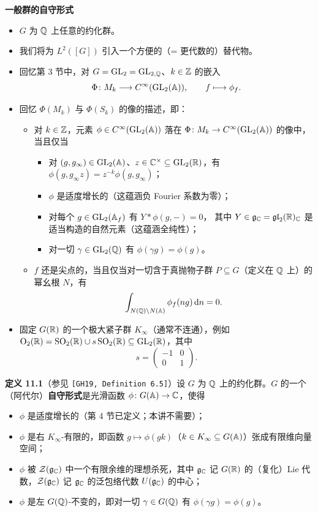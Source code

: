 \medskip
\noindent\textbf{一般群的自守形式}
\begin{itemize}
\item $G$ 为 $\mathbb{Q}$ 上任意的约化群。
\item 我们将为 $L^2([G])$ 引入一个方便的（= 更代数的）替代物。
\item 回忆第 3 节中，对 $G=\operatorname{GL}_2=\operatorname{GL}_{2,\mathbb{Q}}$、$k\in\mathbb{Z}$ 的嵌入
\[
\Phi\colon M_k\longrightarrow C^\infty(\operatorname{GL}_2(\mathbb{A})),\qquad f\longmapsto\phi_f.
\]
\item 回忆 $\Phi(M_k)$ 与 $\Phi(S_k)$ 的像的描述，即：
\begin{itemize}
\item 对 $k\in\mathbb{Z}$，元素 $\phi\in C^\infty(\operatorname{GL}_2(\mathbb{A}))$ 落在 $\Phi\colon M_k\to C^\infty(\operatorname{GL}_2(\mathbb{A}))$ 的像中，当且仅当
\begin{itemize}
\item 对 $(g,g_\infty)\in\operatorname{GL}_2(\mathbb{A})$、$z\in\mathbb{C}^\times\subseteq\operatorname{GL}_2(\mathbb{R})$，有 $\phi(g,g_\infty z)=z^{-k}\phi(g,g_\infty)$；
\item $\phi$ 是适度增长的（这蕴涵负 Fourier 系数为零）；
\item 对每个 $g\in\operatorname{GL}_2(\mathbb{A}_f)$ 有 $Y*\phi(g,-)=0$，
其中 $Y\in\mathfrak{g}_{\mathbb{C}}=\mathfrak{gl}_2(\mathbb{R})_{\mathbb{C}}$ 是适当构造的自然元素（这蕴涵全纯性）；
\item 对一切 $\gamma\in\operatorname{GL}_2(\mathbb{Q})$ 有 $\phi(\gamma g)=\phi(g)$。
\end{itemize}
\item $f$ 还是尖点的，当且仅当对一切含于真抛物子群 $P\subseteq G$（定义在 $\mathbb{Q}$ 上）的幂幺根 $N$，有
\[
\int_{N(\mathbb{Q})\backslash N(\mathbb{A})}\phi_f(ng)\,\mathrm{d}n=0.
\]
\end{itemize}
\item 固定 $G(\mathbb{R})$ 的一个极大紧子群 $K_\infty$（通常不连通），例如 $\mathrm{O}_2(\mathbb{R})=\operatorname{SO}_2(\mathbb{R})\cup s\operatorname{SO}_2(\mathbb{R})\subseteq\operatorname{GL}_2(\mathbb{R})$，其中
\[
s=\begin{pmatrix}-1&0\\0&1\end{pmatrix}.
\]
\end{itemize}

\medskip
\noindent\textbf{定义 11.1}（参见 \texttt{[GH19, Definition 6.5]}）\label{def:11.1}\quad 设 $G$ 为 $\mathbb{Q}$ 上的约化群。$G$ 的一个（阿代尔）\textbf{自守形式}是光滑函数 $\phi\colon G(\mathbb{A})\to\mathbb{C}$，使得
\begin{itemize}
\item[1)] $\phi$ 是适度增长的（第 4 节已定义；本讲不需要）；
\item[2)] $\phi$ 是右 $K_\infty$-有限的，即函数 $g\mapsto\phi(gk)$（$k\in K_\infty\subseteq G(\mathbb{A})$）张成有限维向量空间；
\item[3)] $\phi$ 被 $\mathcal{Z}(\mathfrak{g}_{\mathbb{C}})$ 中一个有限余维的理想杀死，其中 $\mathfrak{g}_{\mathbb{C}}$ 记 $G(\mathbb{R})$ 的（复化）Lie 代数，$\mathcal{Z}(\mathfrak{g}_{\mathbb{C}})$ 记 $\mathfrak{g}_{\mathbb{C}}$ 的泛包络代数 $U(\mathfrak{g}_{\mathbb{C}})$ 的中心；
\item[4)] $\phi$ 是左 $G(\mathbb{Q})$-不变的，即对一切 $\gamma\in G(\mathbb{Q})$ 有 $\phi(\gamma g)=\phi(g)$。
\end{itemize}

